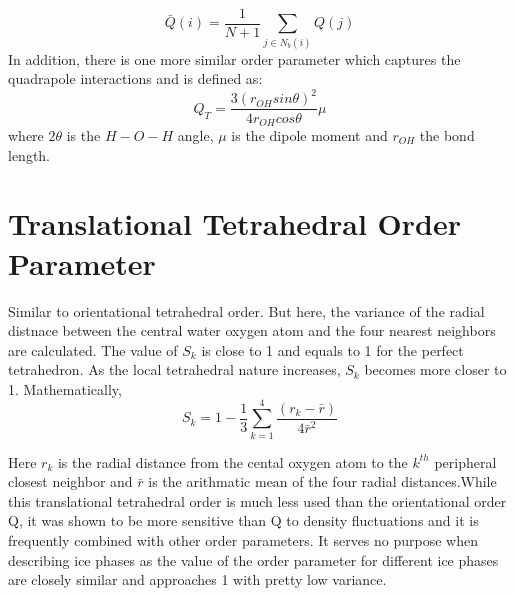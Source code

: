 \[\bar{Q}(i) = \frac{1}{N+1} \sum_{j \in {N}_b(i)} Q(j) \]
In addition, there is one more similar order parameter which captures the quadrapole interactions \cite{Abascal2007} and is defined as:
\[ Q_T = \frac{3(r_{OH}sin\theta)^2}{4r_{OH} cos\theta} \mu\]
where $2\theta$ is the $H-O-H$ angle, $\mu$ is the dipole moment and $r_{OH}$ the bond length.\\
\section{Translational Tetrahedral Order Parameter}
Similar to orientational tetrahedral order. But here, the variance of the radial distnace between the central water oxygen atom and the four nearest neighbors are calculated\cite{CHAU_1998}. The value of $S_k$ is close to 1 and equals to 1 for the perfect tetrahedron. As the local tetrahedral nature increases, $S_k$ becomes more closer to 1.
Mathematically, 
\[ S_k = 1 - \frac{1}{3}\sum_{k=1}^4\frac{(r_k - \bar{r})}{4\bar{r}^2}\]

Here $r_k$ is the radial distance from the cental oxygen atom to the $k^{th}$ peripheral closest neighbor and $\bar{r}$ is the arithmatic mean of the four radial distances.While this translational tetrahedral order is much less used than the orientational order Q, it was shown to be more sensitive than Q to density fluctuations and it is frequently combined with other order parameters\cite{Jedlovszky_1999}. It serves no purpose when describing ice phases as the value of the order parameter for different ice phases are closely similar and approaches 1 with pretty low variance.
